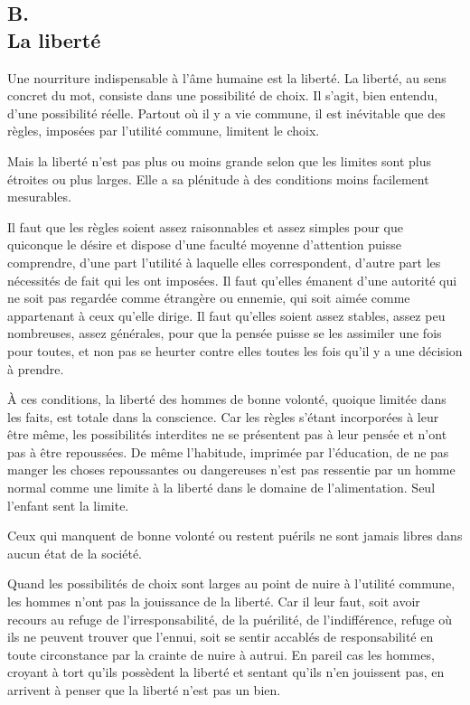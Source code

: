 \documentclass[french,twoside]{book} %
\begin{document}
\subsection[{B. La liberté}]{B. \\
La liberté}
\noindent \par
Une nourriture indispensable à l'âme humaine est la liberté. La liberté, au sens concret du mot, consiste dans une possibilité de choix. Il s'agit, bien entendu, d'une possibilité réelle. Partout où il y a vie commune, il est inévitable que des règles, imposées par l'utilité commune, limitent le choix.\par
Mais la liberté n'est pas plus ou moins grande selon que les limites sont plus étroites ou plus larges. Elle a sa plénitude à des conditions moins facilement mesurables.\par
Il faut que les règles soient assez raisonnables et assez simples pour que quiconque le désire et dispose d'une faculté moyenne d'attention puisse comprendre, d'une part l'utilité à laquelle elles correspondent, d'autre part les nécessités de fait qui les ont imposées. Il faut qu'elles émanent d'une autorité qui ne soit pas regardée comme étrangère ou ennemie, qui soit aimée comme appartenant à ceux qu'elle dirige. Il faut qu'elles soient assez stables, assez peu nombreuses, assez générales, pour que la pensée puisse se les assimiler une fois pour toutes, et non pas se heurter contre elles toutes les fois qu'il y a une décision à prendre.\par
À ces conditions, la liberté des hommes de bonne volonté, quoique limitée dans les faits, est totale dans la conscience. Car les règles s'étant incorporées à leur être même, les possibilités interdites ne se présentent pas à leur pensée et n'ont pas à être repoussées. De même l'habitude, imprimée par l'éducation, de ne pas manger les choses repoussantes ou dangereuses n'est pas ressentie par un homme normal comme une limite à la liberté dans le domaine de l'alimentation. Seul l'enfant sent la limite.\par
Ceux qui manquent de bonne volonté ou restent puérils ne sont jamais libres dans aucun état de la société.\par
Quand les possibilités de choix sont larges au point de nuire à l'utilité commune, les hommes n'ont pas la jouissance de la liberté. Car il leur faut, soit avoir recours au refuge de l'irresponsabilité, de la puérilité, de l'indifférence, refuge où ils ne peuvent trouver que l'ennui, soit se sentir accablés de responsabilité en toute circonstance par la crainte de nuire à autrui. En pareil cas les hommes, croyant à tort qu'ils possèdent la liberté et sentant qu'ils n'en jouissent pas, en arrivent à penser que la liberté n'est pas un bien.
\end{document}
